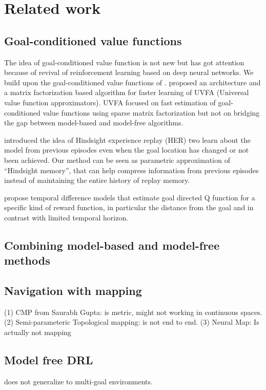 \documentclass[letterpaper]{article} %
\begin{document}
\section{Related work}
\subsection{Goal-conditioned value functions}
The idea of goal-conditioned value function is not new but has got attention because of revival of reinforcement learning based on deep neural networks.
We build upon the goal-conditioned value functions of \citet{schaul2015universal}.
\citet{schaul2015universal} proposed an architecture and a matrix factorization based algorithm for faster learning of UVFA (Universal value function approximators).
UVFA focused on fast estimation of goal-conditioned value functions using sparse
matrix factorization but not on bridging the gap between model-based and model-free
algorithms.


\citet{andrychowicz2016learning} introduced the idea of Hindsight experience replay (HER) two learn about the model from previous episodes even when the goal location has changed or not been achieved.
Our method can be seen as parametric approximation of ``Hindsight memory'',
that can help compress information from previous episodes instead of maintaining the
entire history of replay memory.

\cite{pong2018temporal} propose temporal difference models that estimate goal directed Q function for a specific kind of reward function, in particular the distance from the goal and in contrast with limited temporal horizon.

\subsection{Combining model-based and model-free methods}



\subsection{Navigation with mapping}
 (1) CMP from Saurabh Gupta: is metric, might not working in continuous spaces.
 (2) Semi-parameteric Topological mapping: is not end to end.
 (3) Neural Map: Is actually not mapping

\subsection{Model free DRL }
does not generalize to multi-goal environments.
\end{document}
